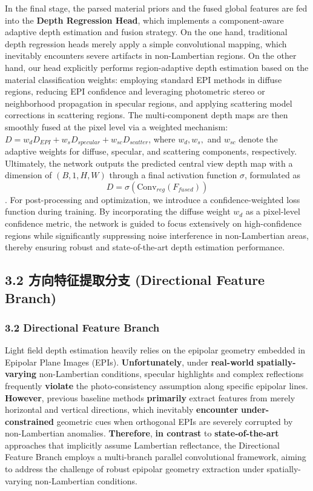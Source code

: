 In the final stage, the parsed material priors and the fused global features are fed into the \textbf{Depth Regression Head}, which implements a component-aware adaptive depth estimation and fusion strategy. On the one hand, traditional depth regression heads merely apply a simple convolutional mapping, which inevitably encounters severe artifacts in non-Lambertian regions. On the other hand, our head explicitly performs region-adaptive depth estimation based on the material classification weights: employing standard EPI methods in diffuse regions, reducing EPI confidence and leveraging photometric stereo or neighborhood propagation in specular regions, and applying scattering model corrections in scattering regions. The multi-component depth maps are then smoothly fused at the pixel level via a weighted mechanism: \(D = w_d D_{EPI} + w_s D_{specular} + w_{sc} D_{scatter}\), where $w_d, w_s,$ and $w_{sc}$ denote the adaptive weights for diffuse, specular, and scattering components, respectively. Ultimately, the network outputs the predicted central view depth map with a dimension of $(B, 1, H, W)$ through a final activation function $\sigma$, formulated as \[
D = \sigma(\text{Conv}_{reg}(F_{fused}))
\]. For post-processing and optimization, we introduce a confidence-weighted loss function during training. By incorporating the diffuse weight $w_d$ as a pixel-level confidence metric, the network is guided to focus extensively on high-confidence regions while significantly suppressing noise interference in non-Lambertian areas, thereby ensuring robust and state-of-the-art depth estimation performance.

\subsection{3.2 方向特征提取分支 (Directional Feature Branch)}

\subsubsection{3.2 Directional Feature Branch}

Light field depth estimation heavily relies on the epipolar geometry embedded in Epipolar Plane Images (EPIs). \textbf{Unfortunately}, under \textbf{real-world} \textbf{spatially-varying} non-Lambertian conditions, specular highlights and complex reflections frequently \textbf{violate} the photo-consistency assumption along specific epipolar lines. \textbf{However}, previous baseline methods \textbf{primarily} extract features from merely horizontal and vertical directions, which inevitably \textbf{encounter} \textbf{under-constrained} geometric cues when orthogonal EPIs are severely corrupted by non-Lambertian anomalies. \textbf{Therefore}, \textbf{in contrast} to \textbf{state-of-the-art} approaches that implicitly assume Lambertian reflectance, the Directional Feature Branch employs a multi-branch parallel convolutional framework, aiming to address the challenge of robust epipolar geometry extraction under spatially-varying non-Lambertian conditions.

